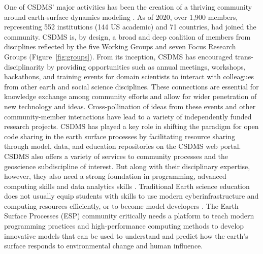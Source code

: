 \documentclass[12pt]{amsart}
\begin{document}
One of CSDMS' major activities has been the creation of a thriving community around earth-surface dynamics modeling \citep{overeem2013strategies}. As of 2020, over 1,900 members, representing 552 institutions (144 US academic) and 71 countries, had joined the community.  CSDMS is, by design, a broad and deep coalition of members from disciplines reflected by the five Working Groups and seven Focus Research Groups (Figure~\ref{fig:groups}).  From its inception, CSDMS has encouraged trans-disciplinarity by providing opportunities such as annual meetings, workshops, hackathons, and training events for domain scientists to interact with colleagues from other earth and social science disciplines.  These connections are essential for knowledge exchange among community efforts and allow for wider penetration of new technology and ideas. Cross-pollination of ideas from these events and other community-member interactions have lead to a variety of independently funded research projects. CSDMS has played a key role in shifting the paradigm for open code sharing in the earth surface processes by facilitating resource sharing through model, data, and education repositories on the CSDMS web portal.  CSDMS also offers a variety of services to community processes and the geoscience subdiscipline of interest.  But along with their disciplinary expertise, however, they also need a strong foundation in programming, advanced computing skills and data analytics skills \citep{atkins2011national}.
Traditional Earth science education does not usually equip students with skills to use modern cyberinfrastructure and computing resources efficiently, or to become model developers \citep{campbell2013taking}. The Earth Surface Processes (ESP) community critically needs a platform to teach modern programming practices and high-performance computing methods to develop innovative models that can be used to understand and predict how the earth’s surface responds to environmental change and human influence.
\end{document}
